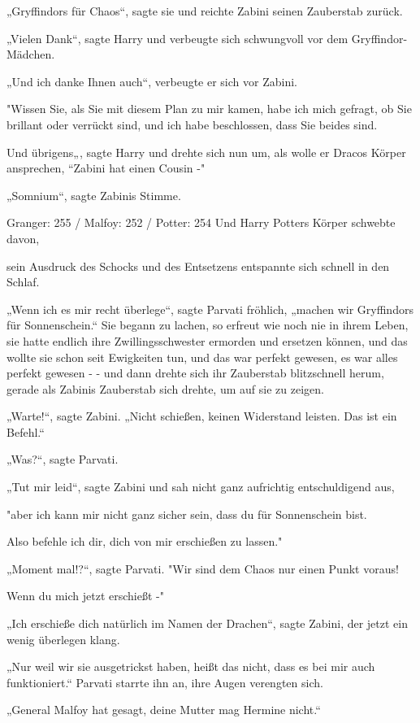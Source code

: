 {„Gryffindors für Chaos“, sagte sie und reichte Zabini seinen Zauberstab zurück.

„Vielen Dank“, sagte Harry und verbeugte sich schwungvoll vor dem Gryffindor-Mädchen.

„Und ich danke Ihnen auch“, verbeugte er sich vor Zabini.

"Wissen Sie, als Sie mit diesem Plan zu mir kamen, habe ich mich gefragt, ob Sie brillant oder verrückt sind, und ich habe beschlossen, dass Sie beides sind.

Und übrigens„, sagte Harry und drehte sich nun um, als wolle er Dracos Körper ansprechen, “Zabini hat einen Cousin -"

„Somnium“, sagte Zabinis Stimme.

Granger: 255 / Malfoy: 252 / Potter: 254 Und Harry Potters Körper schwebte davon,

sein Ausdruck des Schocks und des Entsetzens entspannte sich schnell in den Schlaf.

„Wenn ich es mir recht überlege“, sagte Parvati fröhlich, „machen wir Gryffindors für Sonnenschein.“ Sie begann zu lachen, so erfreut wie noch nie in ihrem Leben, sie hatte endlich ihre Zwillingsschwester ermorden und ersetzen können, und das wollte sie schon seit Ewigkeiten tun, und das war perfekt gewesen, es war alles perfekt gewesen - - und dann drehte sich ihr Zauberstab blitzschnell herum, gerade als Zabinis Zauberstab sich drehte, um auf sie zu zeigen.

„Warte!“, sagte Zabini. „Nicht schießen, keinen Widerstand leisten. Das ist ein Befehl.“

„Was?“, sagte Parvati.

„Tut mir leid“, sagte Zabini und sah nicht ganz aufrichtig entschuldigend aus,

"aber ich kann mir nicht ganz sicher sein, dass du für Sonnenschein bist.

Also befehle ich dir, dich von mir erschießen zu lassen."

„Moment mal!?“, sagte Parvati. "Wir sind dem Chaos nur einen Punkt voraus!

Wenn du mich jetzt erschießt -"

„Ich erschieße dich natürlich im Namen der Drachen“, sagte Zabini, der jetzt ein wenig überlegen klang.

„Nur weil wir sie ausgetrickst haben, heißt das nicht, dass es bei mir auch funktioniert.“ Parvati starrte ihn an, ihre Augen verengten sich.

„General Malfoy hat gesagt, deine Mutter mag Hermine nicht.“

}
